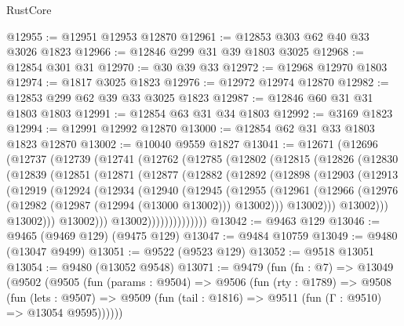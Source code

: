 \begin{lexlean}{RustCore}
\begin{coremodule}
@12955 := @12951 @12953 @12870
@12961 := @12853 @303 @62 @40 @33 @3026 @1823
@12966 := @12846 @299 @31 @39 @1803 @3025
@12968 := @12854 @301 @31
@12970 := @30 @39 @33
@12972 := @12968 @12970 @1803
@12974 := @1817 @3025 @1823
@12976 := @12972 @12974 @12870
@12982 := @12853 @299 @62 @39 @33 @3025 @1823
@12987 := @12846 @60 @31 @31 @1803 @1803
@12991 := @12854 @63 @31 @34 @1803
@12992 := @3169 @1823
@12994 := @12991 @12992 @12870
@13000 := @12854 @62 @31 @33 @1803 @1823 @12870
@13002 := @10040 @9559 @1827
@13041 := @12671
    (@12696
      (@12737
        (@12739
          (@12741
            (@12762
              (@12785
                (@12802
                  (@12815
                    (@12826
                      (@12830
                        (@12839
                          (@12851
                            (@12871
                              (@12877
                                (@12882
                                  (@12892
                                    (@12898
                                      (@12903
                                        (@12913
                                          (@12919
                                            (@12924
                                              (@12934
                                                (@12940
                                                  (@12945
                                                    (@12955
                                                      (@12961
                                                        (@12966
                                                          (@12976
                                                            (@12982
                                                              (@12987 (@12994 (@13000 @13002)))
                                                              @13002)))
                                                        @13002)))
                                                  @13002)))
                                            @13002)))
                                      @13002)))
                                @13002))))))))))))))
@13042 := @9463 @129
@13046 := @9465 (@9469 @129) (@9475 @129)
@13047 := @9484 @10759
@13049 := @9480 (@13047 @9499)
@13051 := @9522 (@9523 @129)
@13052 := @9518 @13051
@13054 := @9480 (@13052 @9548)
@13071 := @9479
    (fun (fn : @7) =>
    @13049
      (@9502
        (@9505
          (fun (params : @9504) =>
          @9506
            (fun (rty : @1789) =>
            @9508
              (fun (lets : @9507) =>
              @9509 (fun (tail : @1816) => @9511 (fun (Γ : @9510) => @13054 @9595))))))

\end{coremodule}
\end{lexlean}
